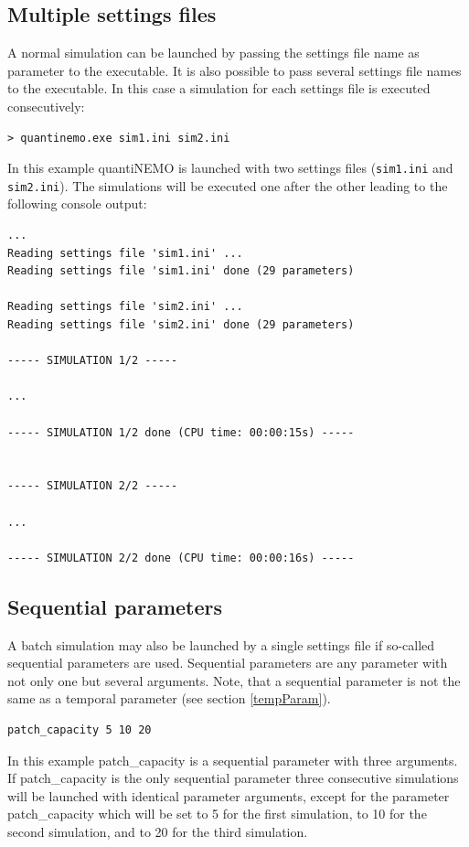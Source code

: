 \documentclass[letterpaper,12pt,oneside]{book}
\begin{document}
\subsection{Multiple settings files}\label{multiFiles}
A normal simulation can be launched by passing the settings file name as parameter to the executable. It is also possible to pass several settings file names to the executable. In this case a simulation for each settings file is executed consecutively: 
\begin{lstlisting}[frame=single]
> quantinemo.exe sim1.ini sim2.ini
\end{lstlisting}
In this example quantiNEMO is launched with two settings files (\texttt{sim1.ini} and \texttt{sim2.ini}). The simulations will be executed one after the other leading to the following console output:

\begin{lstlisting}[frame=single]
...
Reading settings file 'sim1.ini' ...
Reading settings file 'sim1.ini' done (29 parameters)

Reading settings file 'sim2.ini' ...
Reading settings file 'sim2.ini' done (29 parameters)

----- SIMULATION 1/2 -----

...

----- SIMULATION 1/2 done (CPU time: 00:00:15s) -----


----- SIMULATION 2/2 -----

...

----- SIMULATION 2/2 done (CPU time: 00:00:16s) -----
\end{lstlisting}

\subsection{Sequential parameters} \label{seqparam}
A batch simulation may also be launched by a single settings file if so-called sequential parameters are used. Sequential parameters are any parameter with not only one but several arguments. Note, that a sequential parameter is not the same as a temporal parameter (see section \ref{tempParam}). 

\begin{lstlisting}[frame=single]
patch_capacity 5 10 20
\end{lstlisting}

In this example \textsf{patch\_capacity} is a sequential parameter with three arguments. If \textsf{patch\_capacity} is the only sequential parameter three consecutive simulations will be launched with identical parameter arguments, except for the parameter \textsf{patch\_capacity} which will be set to 5 for the first simulation, to 10 for the second simulation, and to 20 for the third simulation.\\
\\
\end{document}
